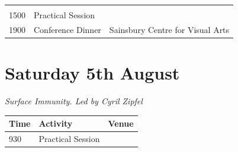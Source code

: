 \documentclass[12pt,]{book}
\theoremstyle{definition}
\theoremstyle{definition}
\theoremstyle{remark}
\begin{document}
\begin{longtable}[]{@{}lll@{}}
\begin{minipage}[t]{0.35\columnwidth}
\strut
\end{minipage}\tabularnewline
\begin{minipage}[t]{0.09\columnwidth}\raggedright\strut
1500\strut
\end{minipage} & \begin{minipage}[t]{0.35\columnwidth}\raggedright\strut
Practical Session\strut
\end{minipage} & \begin{minipage}[t]{0.35\columnwidth}\raggedright\strut
\strut
\end{minipage}\tabularnewline
\begin{minipage}[t]{0.09\columnwidth}\raggedright\strut
1900\strut
\end{minipage} & \begin{minipage}[t]{0.35\columnwidth}\raggedright\strut
Conference Dinner\strut
\end{minipage} & \begin{minipage}[t]{0.35\columnwidth}\raggedright\strut
Sainsbury Centre for Visual Arts\strut
\end{minipage}\tabularnewline
\bottomrule
\end{longtable}

\section*{Saturday 5th August}\label{saturday-5th-august}

\emph{Surface Immunity. Led by Cyril Zipfel}

\begin{longtable}[]{@{}lll@{}}
\toprule
\begin{minipage}[b]{0.09\columnwidth}\raggedright\strut
Time\strut
\end{minipage} & \begin{minipage}[b]{0.23\columnwidth}\raggedright\strut
Activity\strut
\end{minipage} & \begin{minipage}[b]{0.09\columnwidth}\raggedright\strut
Venue\strut
\end{minipage}\tabularnewline
\midrule
\endhead
\begin{minipage}[t]{0.09\columnwidth}\raggedright\strut
930\strut
\end{minipage} & \begin{minipage}[t]{0.23\columnwidth}\raggedright\strut
Practical Session\strut
\end{minipage} & \begin{minipage}[t]{0.09\columnwidth}\raggedright\strut
\strut
\end{minipage}\tabularnewline
\bottomrule
\end{longtable}
\end{document}
